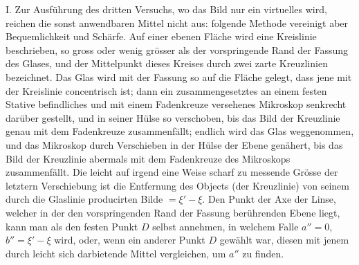 I. Zur Ausführung des dritten Versuchs, wo das Bild nur ein virtuelles wird, reichen die sonst anwendbaren Mittel nicht aus: folgende Methode vereinigt aber Bequemlichkeit und Schärfe. Auf einer ebenen Fläche wird eine Kreislinie beschrieben, so gross oder wenig grösser als der vorspringende Rand der Fassung des Glases, und der Mittelpunkt dieses Kreises durch zwei zarte Kreuzlinien bezeichnet. Das Glas wird mit der Fassung so auf die Fläche gelegt, dass jene mit der Kreislinie concentrisch ist; dann ein zusammengesetztes an einem festen Stative befindliches und mit einem Fadenkreuze versehenes Mikroskop senkrecht darüber gestellt, und in seiner Hülse so verschoben, bis das Bild der Kreuzlinie genau mit dem Fadenkreuze zusammenfällt; endlich wird das Glas weggenommen, und das Mikroskop durch Verschieben in der Hülse der Ebene genähert, bis das Bild der Kreuzlinie abermals mit dem Fadenkreuze des Mikroskops zusammenfällt. Die leicht auf irgend eine Weise scharf zu messende Grösse der letztern Verschiebung ist die Entfernung des Objects (der Kreuzlinie) von seinem durch die Glaslinie producirten Bilde $=\xi'-\xi$. Den Punkt der Axe der Linse, welcher in der den vorspringenden Rand der Fassung berührenden Ebene liegt, kann man als den festen Punkt $D$ selbst annehmen, in welchem Falle $a''=0$, $b''=\xi'-\xi$ wird, oder, wenn ein anderer Punkt $D$ gewählt war, diesen mit jenem durch leicht sich darbietende Mittel vergleichen, um $a''$ zu finden.

